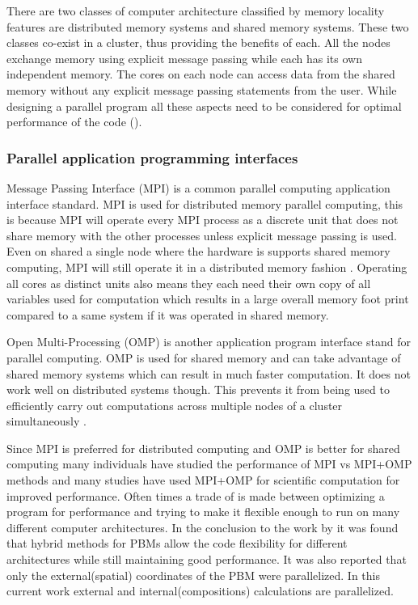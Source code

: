 \documentclass[preprint,11pt,authoryear]{elsarticle}
\begin{document}
There are two classes of computer architecture classified by memory locality features are 
distributed memory systems and shared memory systems. These two classes co-exist in a cluster, 
thus providing the benefits of each. All the nodes exchange memory using explicit message passing 
while each has its own independent memory. The cores on each node can access data from the 
shared memory without any explicit message passing statements from the user. While designing a 
parallel program all these aspects need to be considered for optimal performance of the code 
(\cite{Adhianto2007}).


\subsubsection{Parallel application programming interfaces}
Message Passing Interface (MPI) is a common parallel computing application interface standard. 
MPI is used for distributed memory parallel computing, this is because MPI will operate every MPI 
process as a discrete unit that does not share memory with the other processes unless explicit 
message passing is used. Even on shared a single node where the hardware is supports shared 
memory computing, MPI will still operate it in a distributed memory fashion \citep{Jin2011}. Operating all 
cores as distinct units also means they each need their own copy of all variables used for computation 
which results in a large overall memory foot print compared to a same system if it was operated in 
shared memory. 

Open Multi-Processing (OMP) is another application program interface stand for parallel 
computing. OMP is used for shared memory and can take advantage of shared memory systems which 
can result in much faster computation. It does not work well on distributed systems though. This 
prevents it from being used to efficiently carry out computations across multiple nodes of a cluster 
simultaneously \citep{Jin2011}. 

Since MPI is preferred for distributed computing and OMP is better for shared computing many 
individuals have studied the performance of MPI vs MPI+OMP methods and many studies have used 
MPI+OMP for scientific computation for improved performance. Often times a trade of is made 
between optimizing a program for performance and trying to make it flexible enough to run on many 
different computer architectures. In the conclusion to the work by \cite{Bettencourt2017} it was found 
that hybrid methods for PBMs allow the code flexibility for different architectures while still maintaining 
good performance.  It was also reported that only the external(spatial) coordinates of the PBM were 
parallelized. In this current work external and internal(compositions) calculations are parallelized. 
\end{document}
